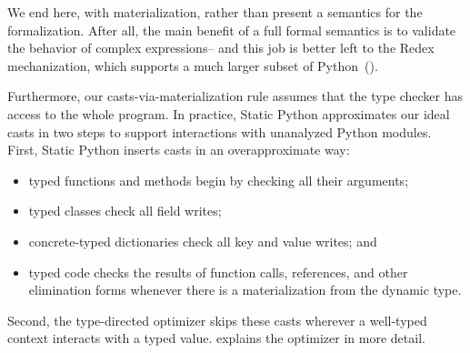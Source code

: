 \documentclass[english,cleveref,crc]{programming}
\newcommand{\SP}{Static Python}
\begin{document}
We end here, with materialization, rather than present a semantics
for the formalization.
After all, the main benefit of a full formal semantics is to validate
the behavior of complex expressions\--- and this job is
better left to the Redex mechanization, which supports a much
larger subset of Python~().

Furthermore, our casts-via-materialization rule assumes that the
type checker has access to the whole program.
In practice, \SP{} approximates our ideal casts in two steps
to support interactions with unanalyzed Python modules.
First, \SP{} inserts casts in an overapproximate way:
\begin{itemize}
  \item
    typed functions and methods begin by checking all their arguments;
  \item
    typed classes check all field writes;
  \item
    concrete-typed dictionaries check all key and value writes; and
  \item
    typed code checks the results of function calls, references, and other elimination forms
    whenever there is a materialization from the dynamic type.
\end{itemize}
Second, the type-directed optimizer skips these casts wherever
a well-typed context interacts with a typed value.
 explains the optimizer in more detail.
\end{document}
